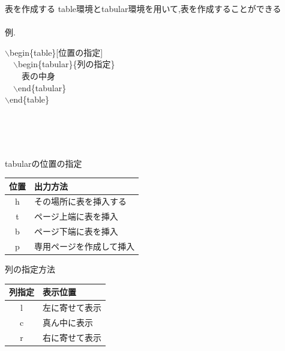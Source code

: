 \documentclass[dvipdfmx]{beamer}
\newcommand{\tbs}{$\backslash$}
\begin{document}
  \begin{frame}{表を作成する}
    table環境とtabular環境を用いて,表を作成することができる\\~\\
    \scriptsize
    例.\\
    \centering
    \begin{minipage}[c]{4cm}
    \tbs begin\{table\}[位置の指定]\\
    ~~\tbs begin\{tabular\}\{列の指定\}\\
    ~~~~表の中身\\
    ~~\tbs end\{tabular\}\\
    \tbs end\{table\}
  \end{minipage}
  ~\\~\\~\\
  \begin{minipage}[c]{5cm}
    \begin{table}
      \centering
      tabularの位置の指定
      \begin{tabular}{|c|l|} \hline
        位置&出力方法 \\ \hline
        h&その場所に表を挿入する \\ \hline
        t&ページ上端に表を挿入 \\ \hline
        b&ページ下端に表を挿入 \\ \hline
        p&専用ページを作成して挿入 \\ \hline
      \end{tabular}
    \end{table}
  \end{minipage}
  \begin{minipage}[c]{5cm}
    \begin{table}[h]
      \centering
      列の指定方法
      \begin{tabular}{|c|l|} \hline
        列指定&表示位置 \\ \hline
        l&左に寄せて表示 \\ \hline
        c&真ん中に表示 \\ \hline
        r&右に寄せて表示 \\ \hline
      \end{tabular}
    \end{table}
  \end{minipage}
  \end{frame}
\end{document}
